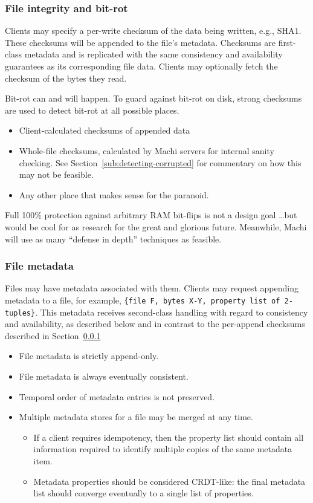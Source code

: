 \documentclass[preprint,10pt]{sigplanconf}
\begin{document}
\subsubsection{File integrity and bit-rot}
\label{sub:bit-rot}

Clients may specify a per-write checksum of the data being written,
e.g., SHA1.  These checksums will be appended to the file's
metadata.  Checksums are first-class metadata and is replicated with
the same consistency and availability guarantees as its corresponding
file data.
Clients may optionally fetch the checksum of the bytes they
read.

Bit-rot can and will happen.  To guard against bit-rot on disk, strong
  checksums are used to detect bit-rot at all possible places.
\begin{itemize}
    \item Client-calculated checksums of appended data
    \item Whole-file checksums, calculated by Machi servers for internal
      sanity checking.  See Section~\ref{sub:detecting-corrupted} for
      commentary on how this may not be feasible.
    \item Any other place that makes sense for the paranoid.
\end{itemize}

Full 100\% protection against arbitrary RAM bit-flips is not a design
goal \ldots but would be cool for as research for the great and
glorious future.  Meanwhile, Machi will use as many ``defense in
depth'' techniques as feasible.

\subsubsection{File metadata}

Files may have metadata associated with them.
Clients may request appending metadata to a file, for example,
  {\tt \{file F, bytes X-Y, property list of 2-tuples\}}.
This metadata receives second-class handling with regard to
consistency and availability, as described below and in contrast to
the per-append checksums described in Section~\ref{sub:bit-rot}

\begin{itemize}
    \item File metadata is strictly append-only.
    \item File metadata is always eventually consistent.
    \item Temporal order of metadata entries is not preserved.
    \item Multiple metadata stores for a file may be merged at any time.
    \begin{itemize}
        \item If a client requires idempotency, then the property list
          should contain all information required to identify multiple
          copies of the same metadata item.
        \item Metadata properties should be considered CRDT-like: the
          final metadata list should converge eventually to a single
          list of properties. 
    \end{itemize}
\end{itemize}
\end{document}
